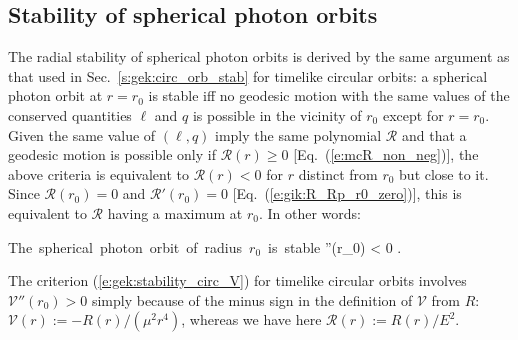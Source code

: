 \subsection{Stability of spherical photon orbits} \label{s:gik:spher_stability}

The radial stability of spherical photon orbits is derived by the same
argument as that used in Sec.~\ref{s:gek:circ_orb_stab} for timelike circular
orbits: a spherical photon orbit at $r=r_0$ is
stable iff no geodesic motion with the same values of the
conserved quantities $\ell$ and $q$
is possible in the vicinity of $r_0$ except for $r=r_0$. Given
the same value of $(\ell,q)$ imply the same polynomial $\mathcal{R}$ and
that a geodesic
motion is possible only if $\mathcal{R}(r) \geq 0$ [Eq.~(\ref{e:mcR_non_neg})],
the above criteria is equivalent to $\mathcal{R}(r) < 0$
for $r$ distinct from $r_0$ but close to it. Since $\mathcal{R}(r_0) = 0$
and $\mathcal{R}'(r_0) = 0$ [Eq.~(\ref{e:gik:R_Rp_r0_zero})], this is equivalent
to $\mathcal{R}$ having a maximum at $r_0$. In other words:
\begin{greybox}
\be \label{e:gik:stability_spher}
    \mbox{The spherical photon orbit of radius $r_0$ is stable} \iff
    ''(r_0) < 0 .
\ee
\end{greybox}
\begin{remark}
The criterion (\ref{e:gek:stability_circ_V}) for timelike circular orbits involves
$\mathcal{V}''(r_0) > 0$ simply because
of the minus sign in the definition of $\mathcal{V}$ from $R$:
$\mathcal{V}(r) := - R(r) / (\mu^2 r^4)$, whereas we have here
$\mathcal{R}(r) := R(r)/E^2$.
\end{remark}

